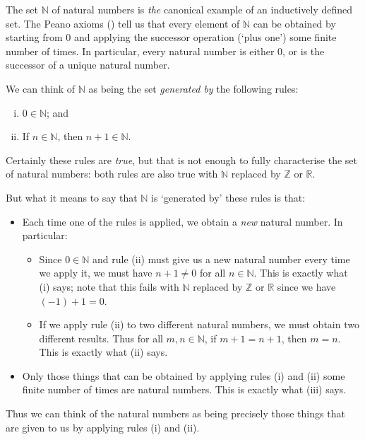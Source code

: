\begin{example}
\label{exNaturalNumbersAsInductivelyDefinedSetPreliminary}
The set $\mathbb{N}$ of natural numbers is \textit{the} canonical example of an inductively defined set. The Peano axioms () tell us that every element of $\mathbb{N}$ can be obtained by starting from $0$ and applying the successor operation (`plus one') some finite number of times. In particular, every natural number is either $0$, or is the successor of a unique natural number.

We can think of $\mathbb{N}$ as being the set \textit{generated by} the following rules:
\begin{enumerate}[(i)]
\item $0 \in \mathbb{N}$; and
\item If $n \in \mathbb{N}$, then $n+1 \in \mathbb{N}$.
\end{enumerate}
Certainly these rules are \textit{true}, but that is not enough to fully characterise the set of natural numbers: both rules are also true with $\mathbb{N}$ replaced by $\mathbb{Z}$ or $\mathbb{R}$.

But what it means to say that $\mathbb{N}$ is `generated by' these rules is that:
\begin{itemize}
\item Each time one of the rules is applied, we obtain a \textit{new} natural number. In particular:
\begin{itemize}
\item Since $0 \in \mathbb{N}$ and rule (ii) must give us a new natural number every time we apply it, we must have $n+1 \ne 0$ for all $n \in \mathbb{N}$. This is exactly what (i) says; note that this fails with $\mathbb{N}$ replaced by $\mathbb{Z}$ or $\mathbb{R}$ since we have $(-1)+1 = 0$.
\item If we apply rule (ii) to two different natural numbers, we must obtain two different results. Thus for all $m,n \in \mathbb{N}$, if $m+1=n+1$, then $m=n$. This is exactly what (ii) says.
\end{itemize}
\item Only those things that can be obtained by applying rules (i) and (ii) some finite number of times are natural numbers. This is exactly what (iii) says.
\end{itemize}

Thus we can think of the natural numbers as being precisely those things that are given to us by applying rules (i) and (ii).
\end{example}

